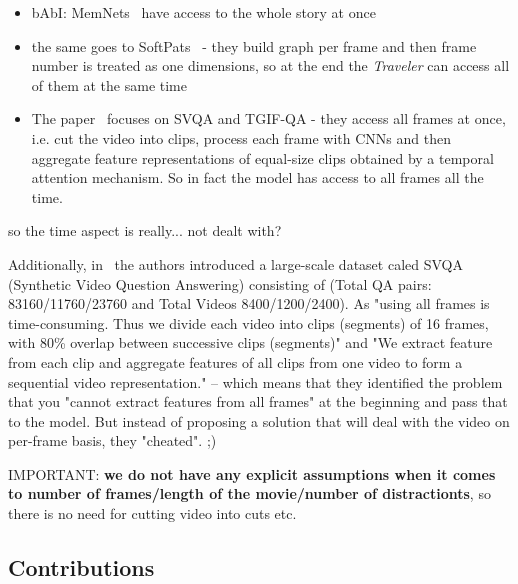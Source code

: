 \begin{itemize}
\item bAbI:  MemNets~\cite{weston2014memory} have access to the whole story at once
\item the same goes to SoftPats~\cite{haurilet2019s} - they build graph per frame and then frame number is treated as one dimensions, so at the end the \textit{Traveler} can access all of them at the same time 
\item The paper~\cite{le2019learning} focuses on SVQA and TGIF-QA -  they access all frames at once, i.e. cut the video into clips, process each frame with CNNs and then aggregate feature representations of equal-size clips obtained by a temporal attention mechanism. So in fact the model has access to all frames all the time.
\end{itemize}
so the time aspect is really... not dealt with?

Additionally, in~\cite{song2018explore} the authors introduced a large-scale dataset caled SVQA (Synthetic Video Question Answering) consisting of (Total QA pairs: 83160/11760/23760 and Total Videos 8400/1200/2400).
As "using all frames is time-consuming. Thus we divide each video into clips (segments) of 16 frames, with 80\% overlap between successive clips (segments)" and "We extract feature from each clip and aggregate features of all clips from one video to form a sequential video representation." -- which means that they identified the problem that you "cannot extract features from all frames" at the beginning and pass that to the model. But instead of proposing a solution that will deal with the video on per-frame basis, they "cheated". ;)

IMPORTANT: \textbf{we do not have any explicit assumptions when it comes to number of frames/length of the movie/number of distractionts}, so there is no need for cutting video into cuts etc.

\subsection{Contributions}

